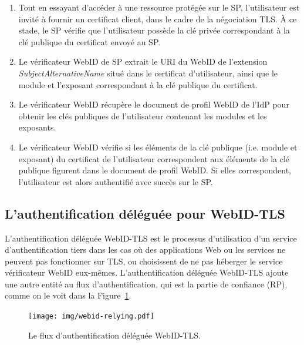 \documentclass[a4paper]{article}
\begin{document}
\begin{enumerate}
\item Tout en essayant d'accéder à une ressource protégée sur le SP, l'utilisateur est invité à fournir un certificat client, dans le cadre de la négociation TLS. À ce stade, le SP vérifie que l'utilisateur possède la clé privée correspondant à la clé publique du certificat envoyé au SP.
\item Le vérificateur WebID de SP extrait le URI du WebID de l'extension \textit{SubjectAlternativeName} situé dans le certificat d'utilisateur, ainsi que le module et l'exposant correspondant à la clé publique du certificat.
\item Le vérificateur WebID récupère le document de profil WebID de l'IdP pour obtenir les clés publiques de l'utilisateur contenant les modules et les exposants.
\item Le vérificateur WebID vérifie si les éléments de la clé publique (i.e. module et exposant) du certificat de l'utilisateur correspondent aux éléments de la clé publique figurent dans le document de profil WebID. Si elles correspondent, l'utilisateur est alors authentifié avec succès sur le SP.
\end{enumerate}

\subsection{L'authentification déléguée pour WebID-TLS}
\label{sec:webid-tls_delegated_auth}
L'authentification déléguée WebID-TLS est le processus d'utilisation d'un service d'authentification tiers dans les cas où des applications Web ou les services ne peuvent pas fonctionner sur TLS, ou choisissent de ne pas héberger le service vérificateur WebID eux-mêmes. L'authentification déléguée WebID-TLS ajoute une autre entité au flux d'authentification, qui est la partie de confiance (RP), comme on le voit dans la Figure~\ref{fig:webid-relying}.\\


\begin{figure}[h]
  \begin{center}
    \texttt{[image: img/webid-relying.pdf]}
        \caption{Le flux d'authentification déléguée WebID-TLS.}
        \label{fig:webid-relying}
  \end{center}
\end{figure}
\end{document}
